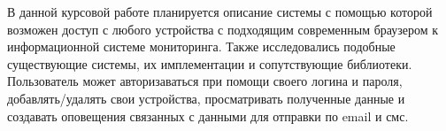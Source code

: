 В данной курсовой работе планируется описание системы с помощью которой
возможен доступ с любого устройства с подходящим современным браузером 
к информационной системе мониторинга. Также исследовались подобные существующие системы,
их имплементации и сопутствующие библиотеки.
Пользователь может авторизаваться при помощи своего логина и пароля, добавлять/удалять свои 
устройства, просматривать полученные данные и создавать оповещения связанных с данными
для отправки по email и смс.